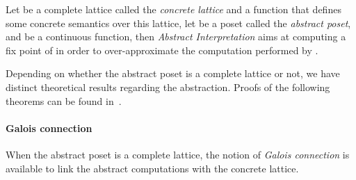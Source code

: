 \documentclass[submission,copyright,creativecommons]{eptcs}
\begin{document}
\noindent
Let  be a complete lattice called the {\it concrete lattice} 
and  a function that defines some concrete semantics over this lattice, let
 be a poset called the {\it abstract poset}, and
 be a continuous function,
then {\it Abstract Interpretation} aims at computing a fix point of  in order to
over-approximate the computation performed by . 

\noindent
Depending on whether the abstract poset is a complete lattice or not,
we have distinct theoretical results regarding the abstraction. Proofs of
the following theorems can be found in~\cite{CH78}.

\paragraph{Galois connection}
When the abstract poset is a complete lattice, the notion of {\it Galois connection} is available
to link the abstract computations with the concrete lattice. 
\end{document}
